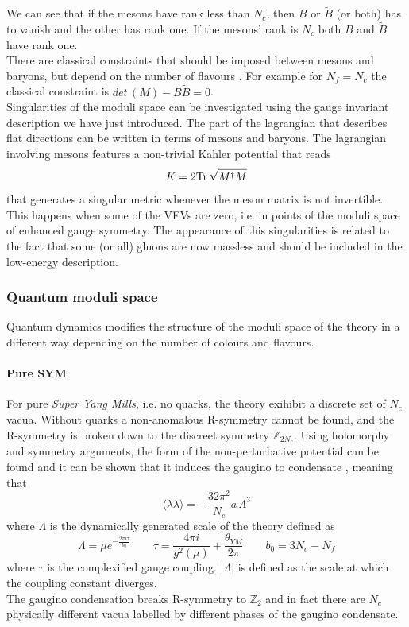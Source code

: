 We can see that if the mesons have rank less than $N_c$, then $B$ or $\tilde{B}$ (or both) has to vanish and the other has rank one. If the mesons' rank is $N_c$ both $B$ and $\tilde{B}$ have rank one.
\\
There are classical constraints that should be imposed between mesons and baryons, but depend on the number of flavours .
For example for $N_f = N_c$ the classical constraint  is $ det \,( M) - B \tilde{B} = 0$.
\\
Singularities of the moduli space can be investigated using the gauge invariant description we have just introduced.
The part of the lagrangian that describes flat directions can be written in terms of mesons and baryons. 
The lagrangian involving mesons features a non-trivial Kahler potential that reads
\begin{equation}
  K = 2 \mathrm{Tr } \, \sqrt{ M^{\dagger} M}
 \end{equation} 
that generates a singular metric whenever the meson matrix is not invertible. 
This happens when some of the VEVs are zero, i.e. in points of the moduli space of enhanced gauge symmetry.
The appearance of this singularities is related to the fact that
some (or all) gluons are now massless and should be included in the low-energy description.




\subsubsection{Quantum moduli space}

Quantum dynamics modifies the structure of the moduli space of the theory in a different way depending on the number of colours and flavours.
\paragraph{Pure SYM}
 For pure \emph{Super Yang Mills}, i.e. no quarks, the theory exihibit a discrete set of $N_c$ vacua. 
Without quarks a non-anomalous R-symmetry cannot be found,
and the R-symmetry is broken down to the discreet symmetry $\mathbb{Z}_{2 N_c}$.
Using holomorphy and symmetry arguments, the form of the non-perturbative potential can be found and it can be shown that it induces the gaugino to condensate \cite{Veneziano:1982ah}, meaning that 
\begin{equation}
\langle \lambda \lambda \rangle = - \frac{32 \pi^2}{N_c} a \, \Lambda^3
\end{equation}
where $\Lambda$ is the dynamically generated scale of the theory defined as
\begin{equation}
\Lambda = \mu e^{-\frac{2 \pi i \tau}{b_0}} \qquad 
\tau  = \frac{4 \pi i}{g^2 (\mu) } + \frac{\theta_{YM}}{2 \pi}  \qquad b_0 = 3 N_c - N_f
\end{equation}
where $\tau$ is the complexified gauge coupling.
$|\Lambda|$ is defined as the scale at which the coupling constant diverges.\\
The gaugino condensation breaks R-symmetry to $\mathbb{Z}_2$ and in fact there are $N_c$ physically different vacua labelled by different phases of the gaugino condensate.
